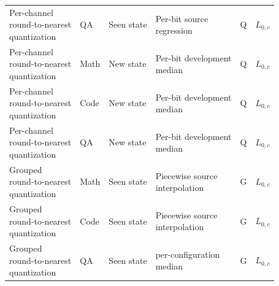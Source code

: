 \begin{table}[!htbp]
\begin{tabular*}{\textwidth}{@{\extracolsep{\fill}}llllcl@{}}
\shortstack[l]{Per-channel\\round-to-nearest\\quantization} & QA & Seen state & \shortstack[l]{Per-bit source\\regression} & Q & $L_{0,c}$ \\
\shortstack[l]{Per-channel\\round-to-nearest\\quantization} & Math & New state & \shortstack[l]{Per-bit development\\median} & Q & $L_{0,c}$ \\
\shortstack[l]{Per-channel\\round-to-nearest\\quantization} & Code & New state & \shortstack[l]{Per-bit development\\median} & Q & $L_{0,c}$ \\
\shortstack[l]{Per-channel\\round-to-nearest\\quantization} & QA & New state & \shortstack[l]{Per-bit development\\median} & Q & $L_{0,c}$ \\
\addlinespace
\shortstack[l]{Grouped\\round-to-nearest\\quantization} & Math & Seen state & \shortstack[l]{Piecewise source\\interpolation} & G & $L_{0,c}$ \\
\shortstack[l]{Grouped\\round-to-nearest\\quantization} & Code & Seen state & \shortstack[l]{Piecewise source\\interpolation} & G & $L_{0,c}$ \\
\shortstack[l]{Grouped\\round-to-nearest\\quantization} & QA & Seen state & \shortstack[l]{per-configuration\\median} & G & $L_{0,c}$ \\

\end{tabular*}
\end{table}

